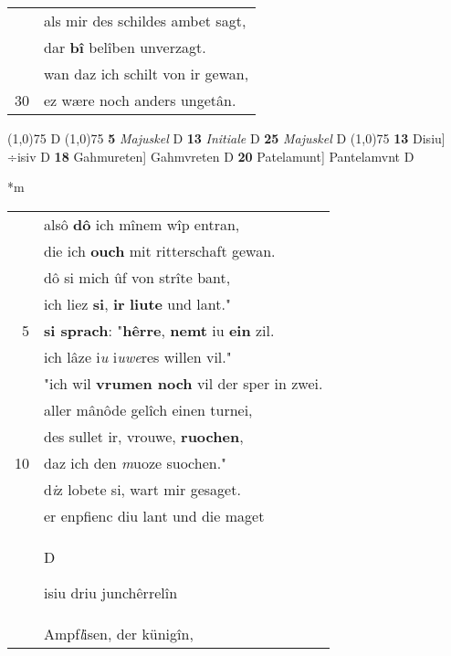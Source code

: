 \documentclass[8pt,a4paper,notitlepage]{article}
\begin{document}
\begin{table}[ht]
\begin{minipage}[t]{0.5\linewidth}
\begin{tabular}{rl}
 & als mir des schildes ambet sagt,\\ 
 & dar \textbf{bî} belîben unverzagt.\\ 
 & wan daz ich schilt von ir gewan,\\ 
30 & ez wære noch anders ungetân.\\ 
\end{tabular}
\scriptsize
\line(1,0){75} \newline
D \newline
\line(1,0){75} \newline
\textbf{5} \textit{Majuskel} D  \textbf{13} \textit{Initiale} D  \textbf{25} \textit{Majuskel} D  \newline
\line(1,0){75} \newline
\textbf{13} Disiu] ÷isiv D \textbf{18} Gahmureten] Gahmvreten D \textbf{20} Patelamunt] Pantelamvnt D \newline
\end{minipage}
\hspace{0.5cm}
\begin{minipage}[t]{0.5\linewidth}
\small
\begin{center}*m
\end{center}
\begin{tabular}{rl}
 & alsô \textbf{dô} ich mînem wîp entran,\\ 
 & die ich \textbf{ouch} mit ritterschaft gewan.\\ 
 & dô si mich ûf von strîte bant,\\ 
 & ich liez \textbf{si}, \textbf{ir} \textbf{liute} und lant."\\ 
5 & \textbf{si sprach}: "\textbf{hêrre}, \textbf{nemt} iu \textbf{ein} zil.\\ 
 & ich lâze i\textit{u} i\textit{uwe}res willen vil."\\ 
 & "ich wil \textbf{vrumen noch} vil der sper in zwei.\\ 
 & aller mânôde gelîch einen turnei,\\ 
 & des sullet ir, vrouwe, \textbf{ruochen},\\ 
10 & daz ich den \textit{m}uoze suochen."\\ 
 & d\textit{i}z lobete si, wart mir gesaget.\\ 
 & er enpfienc diu lant und die maget\\ 
 & \begin{large}D\end{large}isiu driu junchêrrelîn\\ 
 & Ampf\textit{l}isen, der künigîn,\\ 

\end{tabular}
\end{minipage}
\end{table}
\end{document}
